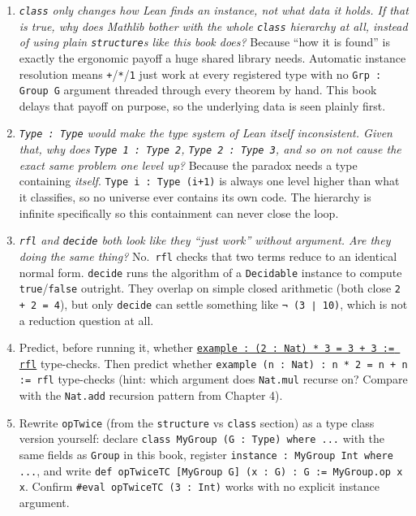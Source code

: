 \begin{enumerate}
\def\labelenumi{\arabic{enumi}.}
\item
  \emph{\texttt{class} only changes how Lean finds an instance, not what data it holds. If that is true, why does Mathlib bother with the whole \texttt{class} hierarchy at all, instead of using plain \texttt{structure}s like this book does?} Because ``how it is found'' is exactly the ergonomic payoff a huge shared library needs. Automatic instance resolution means \texttt{+}/\texttt{*}/\texttt{1} just work at every registered type with no \texttt{Grp : Group G} argument threaded through every theorem by hand. This book delays that payoff on purpose, so the underlying data is seen plainly first.
\item
  \emph{\texttt{Type : Type} would make the type system of Lean itself inconsistent. Given that, why does \texttt{Type 1 : Type 2}, \texttt{Type 2 : Type 3}, and so on not cause the exact same problem one level up?} Because the paradox needs a type containing \emph{itself}. \texttt{Type i : Type (i+1)} is always one level higher than what it classifies, so no universe ever contains its own code. The hierarchy is infinite specifically so this containment can never close the loop.
\item
  \emph{\texttt{rfl} and \texttt{decide} both look like they ``just work'' without argument. Are they doing the same thing?} No.~\texttt{rfl} checks that two terms reduce to an identical normal form. \texttt{decide} runs the algorithm of a \texttt{Decidable} instance to compute \texttt{true}/\texttt{false} outright. They overlap on simple closed arithmetic (both close \texttt{2 + 2 = 4}), but only \texttt{decide} can settle something like \texttt{¬ (3 ∣ 10)}, which is not a reduction question at all.
\item
  Predict, before running it, whether \href{https://lean-lang.org/doc/reference/latest/Tactic-Proofs/Tactic-Reference/}{\texttt{example : (2 : Nat) * 3 = 3 + 3 := rfl}} type-checks. Then predict whether \texttt{example (n : Nat) : n * 2 = n + n := rfl} type-checks (hint: which argument does \texttt{Nat.mul} recurse on? Compare with the \texttt{Nat.add} recursion pattern from Chapter 4).
\item
  Rewrite \texttt{opTwice} (from the \texttt{structure} vs \texttt{class} section) as a type class version yourself: declare \texttt{class MyGroup (G : Type) where ...} with the same fields as \texttt{Group} in this book, register \texttt{instance : MyGroup Int where ...}, and write \texttt{def opTwiceTC [MyGroup G] (x : G) : G := MyGroup.op x x}. Confirm \texttt{\#eval opTwiceTC (3 : Int)} works with no explicit instance argument.

\end{enumerate}
